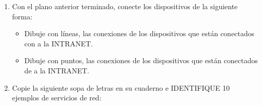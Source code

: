 \documentclass[letterpaper,10pt,spanish]{sphinxmanual}
\let\sphinxpxdimen\pdfpxdimen\else\newdimen\sphinxpxdimen
\begin{document}
\begin{enumerate}
\begin{itemize}
\item {} 
 modem

\end{itemize}
\begin{quote}

\sphinxAtStartPar
{} El plano puede estar desactualizado. En ese caso ajustar el plano al estado actual del aula.
\end{quote}


\begin{savenotes}\sphinxattablestart
\sphinxthistablewithglobalstyle
\centering
\begin{tabulary}{\linewidth}[t]{T}
\sphinxtoprule
\sphinxtableatstartofbodyhook

\begin{sphinxfigure-in-table}
\centering
\capstart
\noindent\sphinxincludegraphics[width=400\sphinxpxdimen]{{image13}.png}
\label{\detokenize{1_guias/10informatica/G1003:id13}}\end{sphinxfigure-in-table}\relax
\\
\sphinxbottomrule
\end{tabulary}
\sphinxtableafterendhook\par
\sphinxattableend\end{savenotes}

\item {} 
\sphinxAtStartPar
Con el plano anterior terminado, conecte los dispositivos de la siguiente forma:
\begin{itemize}
\item {} 
\sphinxAtStartPar
Dibuje con líneas, las conexiones de los dispositivos que están conectados con  a la INTRANET.

\item {} 
\sphinxAtStartPar
Dibuje con puntos, las conexiones de los dispositivos que están conectados de  a la INTRANET.

\end{itemize}

\item {} 
\sphinxAtStartPar
Copie la siguiente sopa de letras en su cuaderno e IDENTIFIQUE 10 ejemplos de servicios de red:

\end{enumerate}
\end{document}
